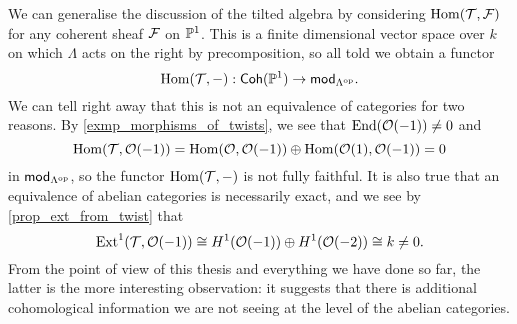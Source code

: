 We can generalise the discussion of the tilted algebra by considering
$\operatorname{Hom}(\mathcal{T}, \mathcal{F})$ for any coherent sheaf $\mathcal{F}$ on $\mathbb{P}^{{1}}$.
This is a finite dimensional vector space over $k$ on which $\Lambda$
acts on the right by precomposition, so all told we obtain a functor
\[
  \operatorname{Hom}(\mathcal{T}, -): \operatorname{\mathsf{Coh}}(\mathbb{P}^{{1}}) \to {\mathsf{mod}}_{{{\Lambda}^{\mathrm{op}}}}.
\]
We can tell right away that this is not an equivalence of categories
for two reasons.
By \cref{exmp_morphisms_of_twists}, we see that $\operatorname{End}(\mathcal{O}({-1})) \neq 0$ and
\[
  \operatorname{Hom}(\mathcal{T}, \mathcal{O}({-1}))
  = \operatorname{Hom}(\mathcal{O}, \mathcal{O}({-1})) \oplus \operatorname{Hom}(\mathcal{O}({1}), \mathcal{O}({-1}))
  = 0
\]
in ${\mathsf{mod}}_{{{\Lambda}^{\mathrm{op}}}}$, so the functor $\operatorname{Hom}(\mathcal{T}, -)$ is not
fully faithful.
It is also true that an equivalence of abelian categories is
necessarily exact, and we see by \cref{prop_ext_from_twist} that
\[
  \operatorname{Ext}^{{1}}(\mathcal{T}, \mathcal{O}({-1}))
  \cong
  H^1(\mathcal{O}({-1})) \oplus H^1(\mathcal{O}({-2}))
  \cong k
  \neq 0.
\]
From the point of view of this thesis and everything we have done so
far, the latter is the more interesting observation: it suggests that
there is additional cohomological information we are not seeing at
the level of the abelian categories.





